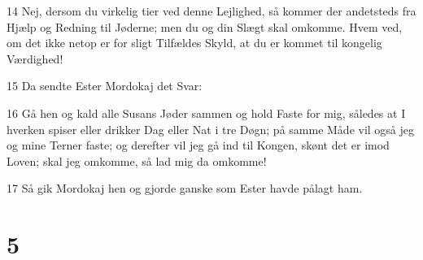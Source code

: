 \par 14 Nej, dersom du virkelig tier ved denne Lejlighed, så kommer der andetsteds fra Hjælp og Redning til Jøderne; men du og din Slægt skal omkomme. Hvem ved, om det ikke netop er for sligt Tilfældes Skyld, at du er kommet til kongelig Værdighed!
\par 15 Da sendte Ester Mordokaj det Svar:
\par 16 Gå hen og kald alle Susans Jøder sammen og hold Faste for mig, således at I hverken spiser eller drikker Dag eller Nat i tre Døgn; på samme Måde vil også jeg og mine Terner faste; og derefter vil jeg gå ind til Kongen, skønt det er imod Loven; skal jeg omkomme, så lad mig da omkomme!
\par 17 Så gik Mordokaj hen og gjorde ganske som Ester havde pålagt ham.

\chapter{5}


